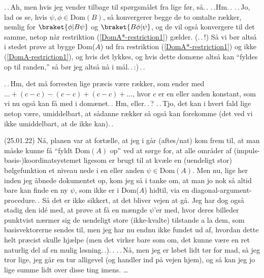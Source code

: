 \documentclass{report}
\begin{document}
.\,.\,Ah, men hvis jeg vender tilbage til spørgsmålet fra lige før, så.\,. .\,.Hm.\,. .\,.\,Jo, lad os se, hvis $\psi, \phi\in\mathrm{Dom}(B)$, så konvergerer begge de to omtalte rækker, nemlig for $\braket{\phi | B \psi}$ og $\braket{B \phi | \psi}$, og de vil også konvergere til det samme, netop når restriktion (\ref{DomA*-restriction1}) gælder. (.\,.\,!) Så vi bør altså i stedet prøve at bygge Dom($A$) ud fra restriktion (\ref{DomA*-restriction1}) og ikke (\ref{DomA-restriction1}), og hvis det lykkes, og hvis dette domæne altså kan ``fyldes op til randen,'' så bør jeg altså nå i mål.\,.\,:)\,.\,. 

.\,.\,Hm, det må forresten lige præcis være rækker, som ender med $\ldots + (c - c) - (c - c) + (c - c) + \ldots$, hvor $c$ er en eller anden konstant, som vi nu også kan få med i domænet.\,. Hm, eller.\,.\,? .\,.\,Tjo, det kan i hvert fald lige netop være, umiddelbart, at sådanne rækker så også kan forekomme (det ved vi ikke umiddelbart, at de ikke kan).\,.





(25.01.22) Nå, planen var at fortælle, at jeg i går (aftes/nat) kom frem til, at man måske kunne få ``fyldt Dom$(A)$ op'' ved at sørge for, at alle områder af (impuls-basis-)koordinatsystemet ligesom er brugt til at kvæle en (uendeligt stor) bølgefunktion et niveau nede i en eller anden $\psi\in\mathrm{Dom}(A)$. Men nu, lige her inden jeg åbnede dokumentet op, %
kom jeg så i tanke om, at man jo nok så altid bare kan finde en ny $\psi$, som ikke er i Dom($A$) hidtil, via en diagonal-argument-procedure.\,. Så det er ikke sikkert, at det bliver vejen at gå. Jeg har dog også stadig den idé med, at prøve at få en mængde $\psi$'er med, hvor deres billeder punktvist nærmer sig de uendeligt store (ikke-kvalte) tilstande a la dem, som basisvektorerne sendes til, men jeg har nu endnu ikke fundet ud af, hvordan dette helt præcist skulle hjælpe (men det virker bare som om, det kunne være en ret naturlig del af en mulig løsning.\,.).\,. .\,.\,Nå, men jeg er løbet lidt tør for mad, %
så jeg tror lige, jeg går en tur alligevel (og handler ind på vejen hjem), og så kan jeg jo lige summe 
lidt over disse ting imens. \ldots
\end{document}
